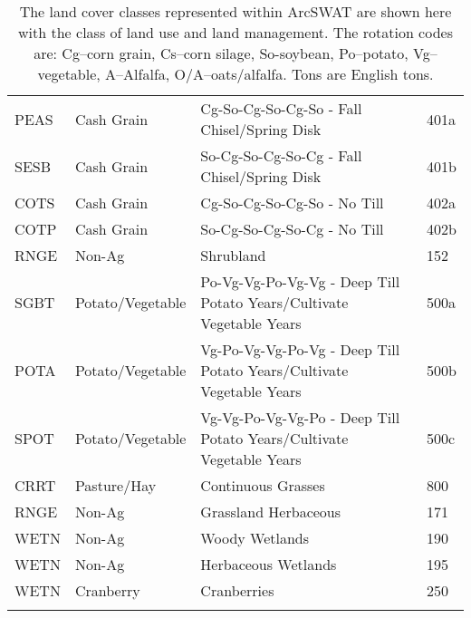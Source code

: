 \begin{longtable}{llll}
  PEAS & Cash Grain & Cg-So-Cg-So-Cg-So - Fall Chisel/Spring Disk & 401a \\ 
  SESB & Cash Grain & So-Cg-So-Cg-So-Cg - Fall Chisel/Spring Disk & 401b \\ 
  COTS & Cash Grain & Cg-So-Cg-So-Cg-So - No Till & 402a \\ 
  COTP & Cash Grain & So-Cg-So-Cg-So-Cg - No Till & 402b \\ 
  RNGE & Non-Ag & Shrubland & 152 \\ 
  SGBT & Potato/Vegetable & Po-Vg-Vg-Po-Vg-Vg - Deep Till Potato Years/Cultivate Vegetable Years & 500a \\ 
  POTA & Potato/Vegetable & Vg-Po-Vg-Vg-Po-Vg - Deep Till Potato Years/Cultivate Vegetable Years & 500b \\ 
  SPOT & Potato/Vegetable & Vg-Vg-Po-Vg-Vg-Po - Deep Till Potato Years/Cultivate Vegetable Years & 500c \\ 
  CRRT & Pasture/Hay & Continuous Grasses & 800 \\ 
  RNGE & Non-Ag & Grassland Herbaceous & 171 \\ 
  WETN & Non-Ag & Woody Wetlands & 190 \\ 
  WETN & Non-Ag & Herbaceous Wetlands & 195 \\ 
  WETN & Cranberry & Cranberries & 250 \\ 
   \hline
\hline
\caption{The land cover classes represented within ArcSWAT are shown here with the class of land use and land management. The rotation codes are: Cg--corn grain, Cs--corn silage, So-soybean, Po--potato, Vg--vegetable, A--Alfalfa, O/A--oats/alfalfa. Tons are English tons.} 
\label{tab:lnd_mgt_def}
\end{longtable}
